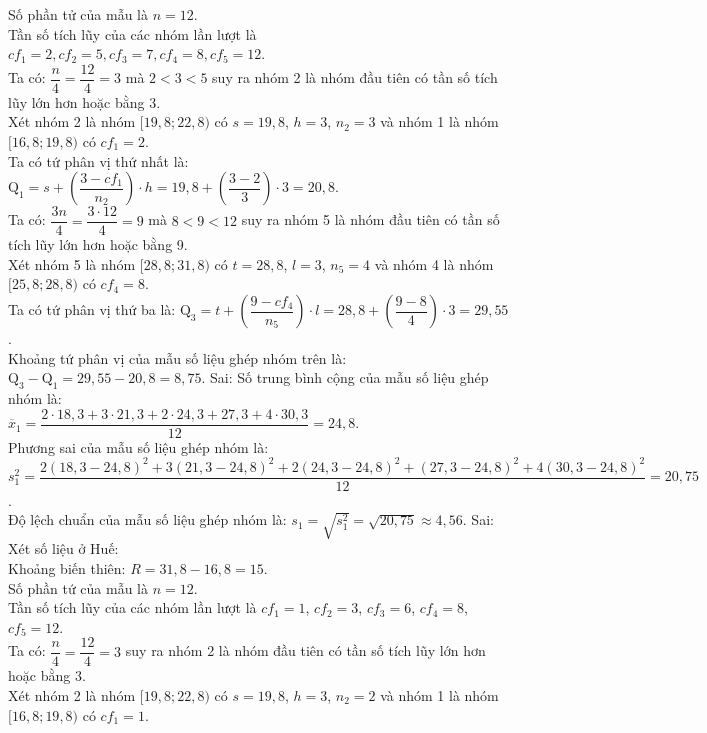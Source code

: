 \begin{ex}
{\begin{itemchoice}
			Số phần tử  của mẫu là $n=12$.\\
			Tần số tích lũy của các nhóm lần lượt  là $cf_1=2,cf_2=5,cf_3=7,cf_4=8,cf_5=12$.\\
			Ta có: $\dfrac{n}{4}=\dfrac{12}{4}=3$ mà $2<3<5$ suy ra nhóm 2 là nhóm đầu tiên có tần số tích lũy lớn  hơn hoặc bằng 3. \\
			Xét  nhóm 2 là nhóm $[19{,}8;22{,}8)$ có $s=19{,}8$, $h=3$, $n_2=3$ và nhóm 1 là nhóm $[16{,}8;19{,}8)$ có $cf_1=2$.\\
			Ta có tứ phân vị thứ  nhất là: $\mathrm{Q}_1=s+\left(\dfrac{3-cf_1}{n_2}\right)\cdot h =19{,}8+\left(\dfrac{3-2}{3}\right)\cdot 3=20{,}8$.\\
			Ta có: $\dfrac{3n}{4}=\dfrac{3\cdot 12}{4}=9$ mà $8<9<12$ suy ra nhóm 5 là nhóm đầu tiên có tần số tích  lũy lớn hơn hoặc bằng 9. \\
			Xét nhóm 5  là nhóm $[28{,}8;31{,}8)$ có $t=28{,}8$, $l=3$, $n_5=4$ và nhóm 4 là nhóm $[25{,}8;28{,}8)$ có $cf_4=8$.\\
			 Ta có tứ phân vị thứ ba là: $\mathrm{Q}_3=t+\left(\dfrac{9-cf_4}{n_5}\right)\cdot l =28{,}8+\left(\dfrac{9-8}{4}\right)\cdot 3=29{,}55$.\\
			Khoảng tứ phân vị của mẫu số  liệu ghép nhóm trên là: $\mathrm{Q}_3-\mathrm{Q}_1=29{,}55-20{,}8=8{,}75$.
			\itemch Sai:  Số trung bình cộng của mẫu số liệu ghép nhóm là: \\
			$\overline{x}_1=\dfrac{2\cdot 18{,}3+3\cdot  21{,}3+2\cdot 24{,}3+27{,}3+4\cdot 30{,}3}{12}=24{,}8$.\\
			Phương sai của mẫu số liệu ghép  nhóm là:\\
			 $s_1^2=\dfrac{2{(18{,}3-24{,}8)^2}+3(21{,}3-24{,}8)^2+2(24{,}3-24{,}8)^2+(27{,}3-24{,}8)^2+4(30{,}3-24{,}8)^2}{12}=20{,}75$.\\
			Độ lệch chuẩn của mẫu số liệu  ghép nhóm là: $s_1=\sqrt{s_1^2}=\sqrt{20{,}75}\approx 4{,}56$.
			\itemch Sai: Xét số liệu ở  Huế:\\
			 Khoảng biến thiên: $R=31{,}8-16{,}8=15$.\\
			Số phần tứ của  mẫu là $n=12$.\\
			Tần số tích lũy của các nhóm lần lượt là $cf_1=1$,  $cf_2=3$, $cf_3=6$, $cf_4=8$, $cf_5=12$.\\
			Ta có: $\dfrac{n}{4}=\dfrac{12}{4}=3$ suy ra nhóm 2 là nhóm  đầu tiên có tần số tích lũy lớn hơn hoặc bằng 3. \\
			Xét nhóm 2 là nhóm $[19{,}8;22{,}8)$ có $s=19{,}8$, $h=3$, $n_2=2$ và nhóm 1 là nhóm  $[16{,}8;19{,}8)$ có $cf_1=1$.\\

\end{itemchoice}}
\end{ex}
